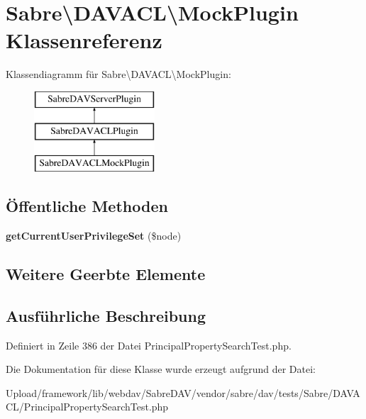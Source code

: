 \hypertarget{class_sabre_1_1_d_a_v_a_c_l_1_1_mock_plugin}{}\section{Sabre\textbackslash{}D\+A\+V\+A\+CL\textbackslash{}Mock\+Plugin Klassenreferenz}
\label{class_sabre_1_1_d_a_v_a_c_l_1_1_mock_plugin}
Klassendiagramm für Sabre\textbackslash{}D\+A\+V\+A\+CL\textbackslash{}Mock\+Plugin\+:\begin{figure}[H]
\begin{center}
\leavevmode
\includegraphics[height=3.000000cm]{class_sabre_1_1_d_a_v_a_c_l_1_1_mock_plugin}
\end{center}
\end{figure}
\subsection*{Öffentliche Methoden}
\begin{DoxyCompactItemize}
\item 
\mbox{\label{class_sabre_1_1_d_a_v_a_c_l_1_1_mock_plugin_aead082c50a801e22d2d0ad1bcf159b13}} 
{\bfseries get\+Current\+User\+Privilege\+Set} (\$node)
\end{DoxyCompactItemize}
\subsection*{Weitere Geerbte Elemente}


\subsection{Ausführliche Beschreibung}


Definiert in Zeile 386 der Datei Principal\+Property\+Search\+Test.\+php.



Die Dokumentation für diese Klasse wurde erzeugt aufgrund der Datei\+:\begin{DoxyCompactItemize}
\item 
Upload/framework/lib/webdav/\+Sabre\+D\+A\+V/vendor/sabre/dav/tests/\+Sabre/\+D\+A\+V\+A\+C\+L/Principal\+Property\+Search\+Test.\+php\end{DoxyCompactItemize}
